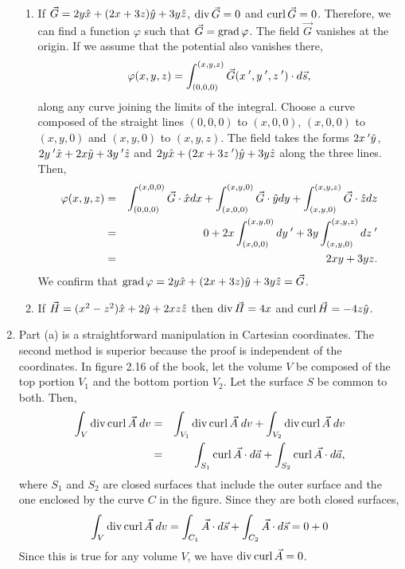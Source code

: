 \documentclass{article}
\begin{document}
\begin{enumerate}
\begin{enumerate}
\item If $\vec{G} = 2y\hat{x} + (2x + 3z)\hat{y} + 3y\hat{z}$, $\operatorname{div}\vec{G} = 0$ and
$\operatorname{curl}\vec{G} = 0$. Therefore, we can find a function $\varphi$ such that $\vec{G}
= \operatorname{grad}\varphi$. The field $\vec{G}$ vanishes at the origin. If we assume that the
potential also vanishes there,
\[
\varphi(x, y, z) = \int_{(0, 0, 0)}^{(x, y, z)} \vec{G}(x^{\;\prime}, y^{\;\prime}, z^{\;\prime})\cdot d\vec{s},
\]
along any curve joining the limits of the integral. Choose a curve composed of the
straight lines $(0, 0, 0)$ to $(x, 0, 0)$, $(x, 0, 0)$ to $(x, y, 0)$ and $(x, y, 0)$
to $(x, y, z)$. The field takes the forms $2x^{\;\prime}\hat{y}$, $2y^{\;\prime}\hat{x} + 2x\hat{y}
+ 3y^{\;\prime}\hat{z}$ and $2y\hat{x} + (2x + 3z^{\;\prime})\hat{y} + 3y\hat{z}$ along the three
lines. Then,
\begin{eqnarray*}
\varphi(x, y, z) &=& \int_{(0, 0, 0)}^{(x, 0, 0)}\vec{G}\cdot\hat{x}dx +
\int_{(x, 0, 0)}^{(x, y, 0)}\vec{G}\cdot\hat{y}dy + 
\int_{(x, y, 0)}^{(x, y, z)}\vec{G}\cdot\hat{z}dz \\
 &=& 0 + 2x\int_{(x, 0, 0)}^{(x, y, 0)} dy^{\;\prime} + 3y\int_{(x, y, 0)}^{(x, y, z)} dz^{\;\prime} \\
 &=& 2xy + 3yz.
\end{eqnarray*}
We confirm that $\operatorname{grad}\varphi = 2y\hat{x} + (2x + 3z)\hat{y} + 3y\hat{z} = \vec{G}$.

\item If $\vec{H} = (x^2 - z^2)\hat{x} + 2\hat{y} + 2xz\hat{z}$ then $\operatorname{div}\vec{H}
 = 4x$ and $\operatorname{curl}\vec{H} = -4z\hat{y}$.
\end{enumerate}

\item Part (a) is a straightforward manipulation in Cartesian coordinates. The
second method is superior because the proof is independent of the coordinates.
In figure 2.16 of the book, let the volume $V$ be composed of the top portion
$V_1$ and the bottom portion $V_2$. Let the surface $S$ be common to both.
Then,
\begin{eqnarray*}
\int_V\operatorname{div}\operatorname{curl}\vec{A}\;dv &=& \int_{V_1}\operatorname{div}\operatorname{curl}\vec{A}\;dv + 
  \int_{V_2}\operatorname{div}\operatorname{curl}\vec{A}\;dv \\
  &=& \int_{S_1}\operatorname{curl}\vec{A}\cdot d\vec{a} + \int_{S_2}\operatorname{curl}\vec{A}\cdot d\vec{a},
\end{eqnarray*}
where $S_1$ and $S_2$ are closed surfaces that include the outer surface and the
one enclosed by the curve $C$ in the figure. Since they are both closed surfaces,
\[
\int_V\operatorname{div}\operatorname{curl}\vec{A}\;dv = \int_{C_1}\vec{A}\cdot d\vec{s} + 
\int_{C_2}\vec{A}\cdot d\vec{s} = 0 + 0
\]
Since this is true for any volume $V$, we have $\operatorname{div}\operatorname{curl}\vec{A} = 0$.


\end{enumerate}
\end{document}
